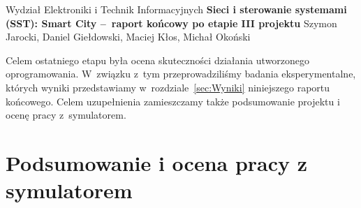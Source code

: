 \documentclass[11pt, a4paper, twoside]{article}
\begin{document}
	
	\begin{center} 
		{\Large Wydział Elektroniki i Technik Informacyjnych}
		\vskip0.2cm
		{\LARGE \textbf{Sieci i sterowanie systemami (SST): Smart City --~raport końcowy po etapie III projektu } } 
		\vskip0.3cm
		{\Large Szymon Jarocki, Daniel Giełdowski, Maciej Kłos, Michał Okoński}
		\vskip0.8cm
	\end{center} 	
	
Celem ostatniego etapu była ocena skuteczności działania utworzonego oprogramowania. W~związku z~tym przeprowadziliśmy badania eksperymentalne, których wyniki przedstawiamy w~rozdziale~\ref{sec:Wyniki} niniejszego raportu końcowego. Celem uzupełnienia zamieszczamy także podsumowanie projektu i ocenę pracy z~symulatorem.

\label{sec:Wyniki}



\section{Podsumowanie i ocena pracy z symulatorem}
	
	
	
		
\end{document}
